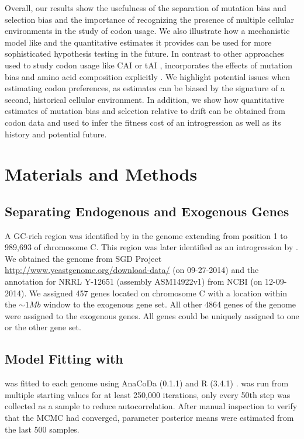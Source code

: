 \documentclass[fleqn,letterpaper]{article}
\begin{document}
Overall, our results show the usefulness of the separation of mutation bias and selection bias and the importance of recognizing the presence of multiple cellular environments in the study of codon usage.
We also illustrate how a mechanistic model like \ROC and the quantitative estimates it provides can be used for more sophisticated hypothesis testing in the future.
In contrast to other approaches used to study codon usage like CAI \citep{sharp1987} or tAI \citep{dosreis2004}, \ROC incorporates the effects of mutation bias and amino acid composition explicitly \cite{cope2018}.
We highlight potential issues when estimating codon preferences, as estimates can be biased by the signature of a second, historical cellular environment.
In addition, we show how quantitative estimates of mutation bias and selection relative to drift can be obtained from codon data and used to infer the fitness cost of an introgression as well as its history and potential future.


\section*{Materials and Methods}

\subsection*{Separating Endogenous and Exogenous Genes}
A GC-rich region was identified by \citet{payen2009} in the \kluyveri genome extending from position 1 to 989,693 of chromosome C.
This region was later identified as an introgression by \citet{friedrich2015}.
We obtained the \kluyveri genome from SGD Project \url{http://www.yeastgenome.org/download-data/} (on 09-27-2014) and the annotation for \kluyveri NRRL Y-12651 (assembly ASM14922v1) from NCBI (on 12-09-2014).
We assigned 457 genes located on chromosome C with a location within the $\sim 1 Mb$ window to the exogenous gene set.
All other 4864 genes of the \kluyveri genome were assigned to the exogenous genes.
All genes could be uniquely assigned to one or the other gene set.

\subsection*{Model Fitting with \ROC}
\ROC was fitted to each genome using AnaCoDa (0.1.1) \citep{landerer2018} and R (3.4.1) \citep{rcore}.
\ROC was run from multiple starting values for at least 250,000 iterations, only every 50th step was collected as a sample to reduce autocorrelation. 
After manual inspection to verify that the MCMC had converged, parameter posterior means were estimated from the last 500 samples.
\end{document}
